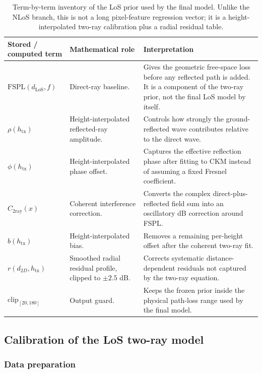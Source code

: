 \begin{table}[H]
\centering
\footnotesize
\setlength{\tabcolsep}{4pt}
\renewcommand{\arraystretch}{1.08}
\begin{tabularx}{\textwidth}{p{3.2cm} X X}
\toprule
\textbf{Stored / computed term} & \textbf{Mathematical role} & \textbf{Interpretation} \\
\midrule
\(\mathrm{FSPL}(d_{\mathrm{LoS}},f)\) & Direct-ray baseline. & Gives the geometric free-space loss before any reflected path is added. It is a component of the two-ray prior, not the final LoS model by itself. \\
\(\rho(h_{\mathrm{tx}})\) & Height-interpolated reflected-ray amplitude. & Controls how strongly the ground-reflected wave contributes relative to the direct wave. \\
\(\phi(h_{\mathrm{tx}})\) & Height-interpolated phase offset. & Captures the effective reflection phase after fitting to CKM instead of assuming a fixed Fresnel coefficient. \\
\(C_{\mathrm{2ray}}(x)\) & Coherent interference correction. & Converts the complex direct-plus-reflected field sum into an oscillatory dB correction around FSPL. \\
\(b(h_{\mathrm{tx}})\) & Height-interpolated bias. & Removes a remaining per-height offset after the coherent two-ray fit. \\
\(r(d_{2D},h_{\mathrm{tx}})\) & Smoothed radial residual profile, clipped to \(\pm2.5\) dB. & Corrects systematic distance-dependent residuals not captured by the two-ray equation. \\
\(\mathrm{clip}_{[20,180]}\) & Output guard. & Keeps the frozen prior inside the physical path-loss range used by the final model. \\
\bottomrule
\end{tabularx}
\caption{Term-by-term inventory of the LoS prior used by
the final model. Unlike the NLoS branch, this is not a long pixel-feature
regression vector; it is a height-interpolated two-ray calibration plus a
radial residual table.}
\label{tab:x78_los_inventory}
\end{table}

\subsection{Calibration of the LoS two-ray model}
\label{sec:los_calibration}

\subsubsection{Data preparation}

